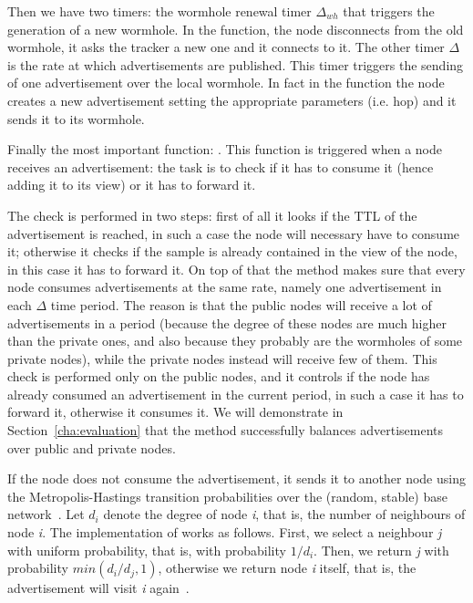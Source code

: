 Then we have two timers: the wormhole renewal timer $\Delta_{wh}$ that triggers the generation of a new wormhole. In the function, the node disconnects from the old wormhole, it asks the tracker a new one and it connects to it. The other timer $\Delta$ is the rate at which advertisements are published. This timer triggers the sending of one advertisement over the local wormhole. In fact in the function the node creates a new advertisement setting the appropriate parameters (i.e. hop) and it sends it to its wormhole.

Finally the most important function: \receivedAd. This function is triggered when a node receives an advertisement: the task is to check if it has to consume it (hence adding it to its view) or it has to forward it. 

The check is performed in two steps: first of all it looks if the TTL of the advertisement is reached, in such a case the node will necessary have to consume it; otherwise it checks if the sample is already contained in the view of the node, in this case it has to forward it. On top of that the \acceptAd method makes sure that every node consumes advertisements at the same rate, namely one advertisement in each $\Delta$ time period. The reason is that the public nodes will receive a lot of advertisements in a period (because the degree of these nodes are much higher than the private ones, and also because they probably are the wormholes of some private nodes), while the private nodes instead will receive few of them. This check is performed only on the public nodes, and it controls if the node has already consumed an advertisement in the current period, in such a case it has to forward it, otherwise it consumes it. We will demonstrate in Section~\ref{cha:evaluation} that the \acceptAd method successfully balances advertisements over public and private nodes.

If the node does not consume the advertisement, it sends it to another node using the Metropolis-Hastings transition probabilities over the (random, stable) base network~\cite{metropolis}.  Let $d_i$ denote the degree of node \textit{i}, that is, the number of neighbours of node \textit{i}. The implementation of \getMetropolisHastingsNeighbour works as follows. First, we select a neighbour \textit{j} with uniform probability, that is, with probability $1/d_i$. Then, we return \textit{j} with probability $min(d_i /d_j , 1)$, otherwise we return node \textit{i} itself, that is, the advertisement will visit \textit{i} again~\cite{wormhole}.

